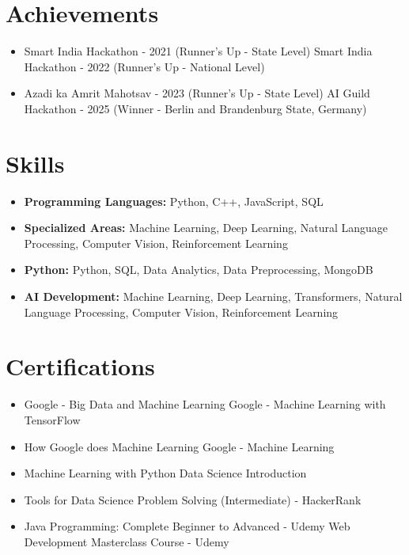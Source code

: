 \documentclass[a4paper,10pt]{article}
\begin{document}
\section*{Achievements}
\begin{itemize}
\item Smart India Hackathon - 2021 (Runner's Up - State Level) \hfill Smart India Hackathon - 2022 (Runner's Up - National Level)
\item Azadi ka Amrit Mahotsav - 2023 (Runner's Up - State Level) \hfill AI Guild Hackathon - 2025 (Winner - Berlin and Brandenburg State, Germany)
\end{itemize}

\section*{Skills}
\begin{itemize}
  \item \textbf{Programming Languages:} Python, C++, JavaScript, SQL
  \item \textbf{Specialized Areas:} Machine Learning, Deep Learning, Natural Language Processing, Computer Vision, Reinforcement Learning
  \item \textbf{Python:} Python, SQL, Data Analytics, Data Preprocessing, MongoDB
  \item \textbf{AI Development:} Machine Learning, Deep Learning, Transformers, Natural Language Processing, Computer Vision, Reinforcement Learning
\end{itemize}

\section*{Certifications}
\begin{itemize}
\item Google - Big Data and Machine Learning \hfill Google - Machine Learning with TensorFlow
\item How Google does Machine Learning \hfill Google - Machine Learning
\item Machine Learning with Python \hfill Data Science Introduction
\item Tools for Data Science \hfill Problem Solving (Intermediate) - HackerRank
\item Java Programming: Complete Beginner to Advanced - Udemy \hfill Web Development Masterclass Course - Udemy
\end{itemize}
\end{document}
